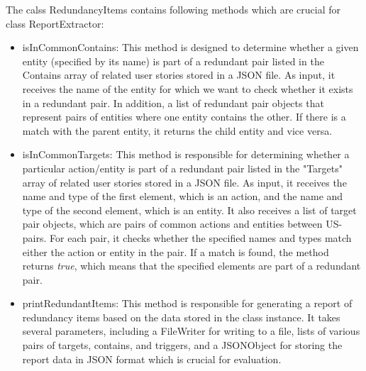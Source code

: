 The calss RedundancyItems contains following methods which are crucial for class ReportExtractor:
\begin{itemize}
	\item isInCommonContains: This method is designed to determine whether a given entity (specified by its name) is part of a redundant pair listed in the Contains array of related user stories stored in a JSON file. As input, it receives the name of the entity for which we want to check whether it exists in a redundant pair. In addition, a list of redundant pair objects that represent pairs of entities where one entity contains the other. If there is a match with the parent entity, it returns the child entity and vice versa.
	\item isInCommonTargets: This method is responsible for determining whether a particular action/entity is part of a redundant pair listed in the "Targets" array of related user stories stored in a JSON file. As input, it receives the name and type of the first element, which is an action, and the name and type of the second element, which is an entity. It also receives a list of target pair objects, which are pairs of common actions and entities between US-pairs. For each pair, it checks whether the specified names and types match either the action or entity in the pair. If a match is found, the method returns \textit{true}, which means that the specified elements are part of a redundant pair.
	\item printRedundantItems: This method is responsible for generating a report of redundancy items based on the data stored in the class instance. It takes several parameters, including a FileWriter for writing to a file, lists of various pairs of targets, contains, and triggers, and a JSONObject for storing the report data in JSON format which is crucial for evaluation.
\end{itemize}
